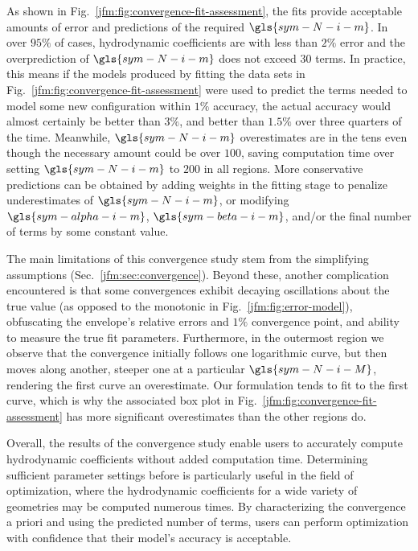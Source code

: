 \documentclass[lineno]{JFM-FLM_Au}
\begin{document}
As shown in Fig.~\ref{jfm:fig:convergence-fit-assessment}, the fits provide acceptable amounts of error and predictions of the required $\gls{sym-N-i-m}$. 
In over $95\%$ of cases, hydrodynamic coefficients are \modelled{} with less than $2\%$ error and the overprediction of $\gls{sym-N-i-m}$ does not exceed $30$ terms. 
In practice, this means if the models produced by fitting the data sets in Fig.~\ref{jfm:fig:convergence-fit-assessment} were used to predict the terms needed to model some new configuration within $1\%$ accuracy, 
the actual accuracy would almost certainly be better than $3\%$, and better than $1.5\%$ over three quarters of the time. 
Meanwhile, $\gls{sym-N-i-m}$ overestimates are in the tens even though the necessary amount could be over $100$, saving computation time over setting $\gls{sym-N-i-m}$ to $200$ in all regions. 
More conservative predictions can be obtained by adding weights in the fitting stage to penalize underestimates of $\gls{sym-N-i-m}$, or modifying $\gls{sym-alpha-i-m}$, $\gls{sym-beta-i-m}$, and/or the final number of terms by some constant value.

The main limitations of this convergence study stem from the simplifying assumptions (Sec.~\ref{jfm:sec:convergence}). 
Beyond these, another complication encountered is that some convergences exhibit decaying oscillations about the true value (as opposed to the monotonic \behaviour{} in Fig.~\ref{jfm:fig:error-model}), 
obfuscating the envelope's relative errors and $1\%$ convergence point, and ability to measure the true fit parameters. 
Furthermore, in the outermost region we observe that the convergence initially follows one logarithmic curve, but then moves along another, steeper one at a particular $\gls{sym-N-i-M}$, rendering the first curve an overestimate. 
Our formulation tends to fit to the first curve, which is why the associated box plot in Fig.~\ref{jfm:fig:convergence-fit-assessment} has more significant overestimates than the other regions do. 

Overall, the results of the convergence study enable users to accurately compute hydrodynamic coefficients without added computation time. 
Determining sufficient parameter settings before \modelling{} is particularly useful in the field of optimization, where the hydrodynamic coefficients for a wide variety of geometries may be computed numerous times. 
By characterizing the convergence \behaviour{} a priori and using the predicted number of terms, users can perform optimization with confidence that their model's accuracy is acceptable.
\end{document}
